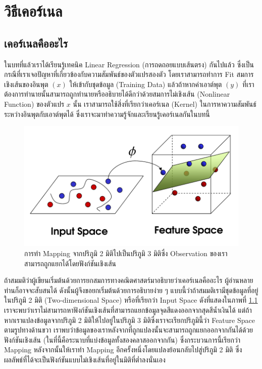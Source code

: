 

\chapter{วิธีเคอร์เนล}
\label{ch:kernel}

\section{เคอร์เนลคืออะไร}
\label{sec:kernel}

ในบทที่แล้วเราได้เรียนรู้เทคนิค Linear Regression (การถดถอยแบบเส้นตรง) กันไปแล้ว ซึ่งเป็นกรณีที่เราเจอปัญหาที่เกี่ยวข้องกับความสัมพันธ์ของตัวแปรสองตัว โดยเราสามารถทำการ Fit สมการเชิงเส้นของอินพุต $(x)$ ให้เข้ากับชุดข้อมูล (Training Data) แล้วถ้าหากค่าเอาต์พุต $(y)$ ที่เราต้องการทำนายนั้นสามารถถูกทำนายหรืออธิบายได้ดีกว่าด้วยสมการไม่เชิงเส้น (Nonlinear Function) ของตัวแปร $x$ นั้น เราสามารถใช้สิ่งที่เรียกว่าเคอร์เนล (Kernel) ในการหาความสัมพันธ์ระหว่างอินพุตกับเอาต์พุตได้ ซึ่งเราจะมาทำความรู้จักและเรียนรู้เคอร์เนลกันในบทนี้

\begin{figure}[H]
    \centering
    \includegraphics[width=0.5\linewidth]{fig/2d_to_3d_spaces.png}
    \caption{การทำ Mapping จากปริภูมิ 2 มิติไปเป็นปริภูมิ 3 มิติซึ่ง Observation ของเราสามารถถูกแยกได้โดยฟังก์ชันเชิงเส้น}
    \label{fig:2d_to_3d}
\end{figure}

ถ้าสมมติว่าผู้เขียนเริ่มต้นด้วยการยกสมการทางคณิตศาสตร์มาอธิบายว่าเคอร์เนลคืออะไร ผู้อ่านหลายท่านก็อาจจะสับสนได้ ดังนั้นผู้จึงขอยกเริ่มต้นด้วยการอธิบายง่าย ๆ แบบนี้ว่าถ้าสมมติเรามีชุดข้อมูลที่อยู่ในปริภูมิ 2 มิติ (Two-dimensional Space) หรือที่เรียกว่า Input Space ดังที่แสดงในภาพที่ \ref{fig:2d_to_3d} เราจะพบว่าเราไม่สามารถหาฟังก์ชันเชิงเส้นที่สามารถแยกข้อมูลจุดสีแดงออกจากสุดสีน้ำเงินได้ แต่ถ้าหากเราแปลงข้อมูลจากปริภูมิ 2 มิติให้ไปอยู่ในปริภูมิ 3 มิติซึ่งเราจะเรียกปริภูมินี้ว่า Feature Space ตามรูปทางด้านขวา เราพบว่าข้อมูลของเราหลังจากที่ถูกแปลงนั้นจะสามารถถูกแยกออกจากกันได้ด้วยฟังก์ชันเชิงเส้น (ในที่นี้คือระนาบที่แบ่งข้อมูลทั้งสองคลาสออกจากกัน) ซึ่งกระบวนการนี้เรียกว่า Mapping หลังจากนั้นให้เราทำ Mapping อีกครั้งหนึ่งโดยแปลงย้อนกลับไปสู่ปริภูมิ 2 มิติ ซึ่งผลลัพธ์ที่ได้จะเป็นฟังก์ชันแบบไม่เชิงเส้นที่อยู่ในมิติที่ต่ำลงนั่นเอง

